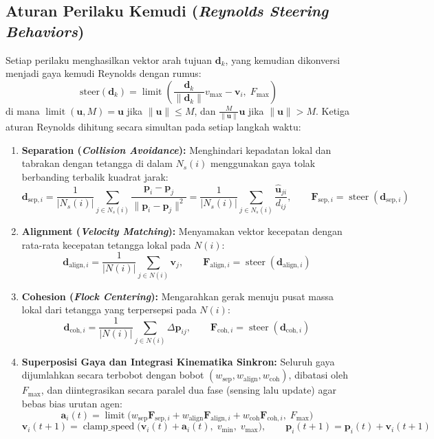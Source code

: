 \documentclass[11pt,a4paper]{article}
\begin{document}
\subsection*{Aturan Perilaku Kemudi (\textit{Reynolds Steering Behaviors})}
Setiap perilaku menghasilkan vektor arah tujuan $\mathbf{d}_k$, yang kemudian dikonversi menjadi gaya kemudi Reynolds dengan rumus:
\[
    \text{steer}(\mathbf{d}_k) = \operatorname{limit}\!\left( \frac{\mathbf{d}_k}{\|\mathbf{d}_k\|} v_{\max} - \mathbf{v}_i,\; F_{\max} \right)
\]
di mana $\operatorname{limit}(\mathbf{u}, M) = \mathbf{u}$ jika $\|\mathbf{u}\| \le M$, dan $\frac{M}{\|\mathbf{u}\|}\mathbf{u}$ jika $\|\mathbf{u}\| > M$. Ketiga aturan Reynolds dihitung secara simultan pada setiap langkah waktu:
\begin{enumerate}
    \item \textbf{Separation (\textit{Collision Avoidance}):} Menghindari kepadatan lokal dan tabrakan dengan tetangga di dalam $N_s(i)$ menggunakan gaya tolak berbanding terbalik kuadrat jarak:
    \[
        \mathbf{d}_{\text{sep}, i} = \frac{1}{|N_s(i)|} \sum_{j \in N_s(i)} \frac{\mathbf{p}_i - \mathbf{p}_j}{\|\mathbf{p}_i - \mathbf{p}_j\|^2} = \frac{1}{|N_s(i)|} \sum_{j \in N_s(i)} \frac{\hat{\mathbf{u}}_{ji}}{d_{ij}}, \qquad \mathbf{F}_{\text{sep}, i} = \operatorname{steer}(\mathbf{d}_{\text{sep}, i})
    \]
    \item \textbf{Alignment (\textit{Velocity Matching}):} Menyamakan vektor kecepatan dengan rata-rata kecepatan tetangga lokal pada $N(i)$:
    \[
        \mathbf{d}_{\text{align}, i} = \frac{1}{|N(i)|} \sum_{j \in N(i)} \mathbf{v}_j, \qquad \mathbf{F}_{\text{align}, i} = \operatorname{steer}(\mathbf{d}_{\text{align}, i})
    \]
    \item \textbf{Cohesion (\textit{Flock Centering}):} Mengarahkan gerak menuju pusat massa lokal dari tetangga yang terpersepsi pada $N(i)$:
    \[
        \mathbf{d}_{\text{coh}, i} = \frac{1}{|N(i)|} \sum_{j \in N(i)} \Delta \mathbf{p}_{ij}, \qquad \mathbf{F}_{\text{coh}, i} = \operatorname{steer}(\mathbf{d}_{\text{coh}, i})
    \]
    \item \textbf{Superposisi Gaya dan Integrasi Kinematika Sinkron:} Seluruh gaya dijumlahkan secara terbobot dengan bobot $(w_{\text{sep}}, w_{\text{align}}, w_{\text{coh}})$, dibatasi oleh $F_{\max}$, dan diintegrasikan secara paralel dua fase (sensing lalu update) agar bebas bias urutan agen:
    \[
        \mathbf{a}_i(t) = \operatorname{limit}\!\Big( w_{\text{sep}}\mathbf{F}_{\text{sep},i} + w_{\text{align}}\mathbf{F}_{\text{align},i} + w_{\text{coh}}\mathbf{F}_{\text{coh},i},\; F_{\max} \Big)
    \]
    \[
        \mathbf{v}_i(t+1) = \operatorname{clamp\_speed}\!\big(\mathbf{v}_i(t) + \mathbf{a}_i(t),\; v_{\min},\; v_{\max}\big), \qquad \mathbf{p}_i(t+1) = \mathbf{p}_i(t) + \mathbf{v}_i(t+1)
    \]
\end{enumerate}
\end{document}
